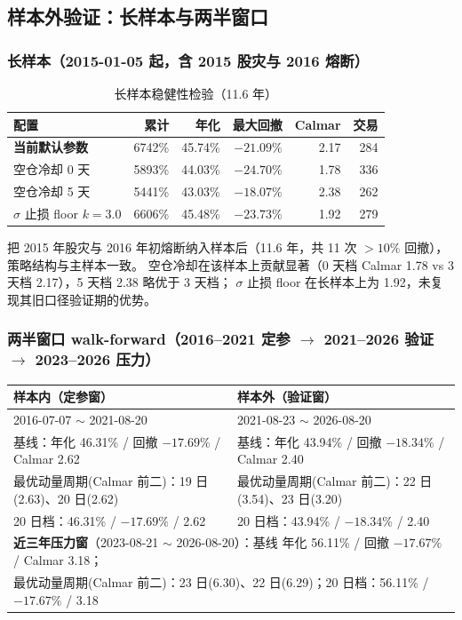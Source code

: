 \documentclass[11pt]{ctexart}
\newcommand{\pos}[1]{\textcolor{poscol}{#1}}   %
\begin{document}
\subsection{样本外验证：长样本与两半窗口}\label{sec:oos}

\subsubsection{长样本（2015-01-05 起，含 2015 股灾与 2016 熔断）}

\begin{table}[htbp]
\centering
\caption{长样本稳健性检验（11.6 年）}
\begin{tabular}{lrrrrr}
\toprule
配置 & 累计 & 年化 & 最大回撤 & Calmar & 交易 \\
\midrule
\textbf{当前默认参数} & \pos{6742\%} & 45.74\% & $-21.09\%$ & 2.17 & 284 \\
空仓冷却 0 天 & 5893\% & 44.03\% & $-24.70\%$ & 1.78 & 336 \\
空仓冷却 5 天 & 5441\% & 43.03\% & $-18.07\%$ & 2.38 & 262 \\
$\sigma$ 止损 floor $k=3.0$ & 6606\% & 45.48\% & $-23.73\%$ & 1.92 & 279 \\
\bottomrule
\end{tabular}
\end{table}

把 2015 年股灾与 2016 年初熔断纳入样本后（11.6 年，共 11 次 $>10\%$ 回撤），策略结构与主样本一致。
空仓冷却在该样本上贡献显著（0 天档 Calmar 1.78 vs 3 天档 2.17），5 天档 2.38 略优于 3 天档；
$\sigma$ 止损 floor 在长样本上为 1.92，未复现其旧口径验证期的优势。

\subsubsection{两半窗口 walk-forward（2016--2021 定参 $\rightarrow$ 2021--2026 验证 $\rightarrow$ 2023--2026 压力）}

\begin{center}
\begin{tabular}{p{5.2cm}p{9.6cm}}
\toprule
\textbf{样本内（定参窗）} & \textbf{样本外（验证窗）} \\
\midrule
\small 2016-07-07 $\sim$ 2021-08-20 &
\small 2021-08-23 $\sim$ 2026-08-20 \\
基线：年化 46.31\% / 回撤 $-17.69\%$ / Calmar 2.62 &
基线：年化 43.94\% / 回撤 $-18.34\%$ / Calmar 2.40 \\
最优动量周期(Calmar 前二)：19 日(2.63)、20 日(2.62) &
最优动量周期(Calmar 前二)：22 日(3.54)、23 日(3.20) \\
20 日档：46.31\% / $-17.69\%$ / 2.62 &
20 日档：43.94\% / $-18.34\%$ / 2.40 \\
\midrule
\multicolumn{2}{l}{\textbf{近三年压力窗}（2023-08-21 $\sim$ 2026-08-20）：基线 年化 56.11\% / 回撤 $-17.67\%$ / Calmar 3.18；}\\
\multicolumn{2}{l}{最优动量周期(Calmar 前二)：23 日(6.30)、22 日(6.29)；20 日档：56.11\% / $-17.67\%$ / 3.18} \\
\bottomrule
\end{tabular}
\end{center}
\end{document}
